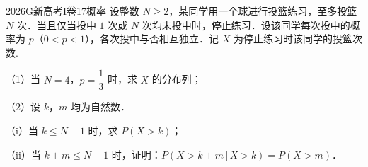 
\begin{problem}{2026}{G}{新高考I卷}{17}{概率}
设整数 $ N\geqslant 2 $，某同学用一个球进行投篮练习，至多投篮 $ N $ 次．当且仅当投中 $ 1 $ 次或 $ N $ 次均未投中时，停止练习．设该同学每次投中的概率为 $ p $（$ 0<p<1 $），各次投中与否相互独立．记 $ X $ 为停止练习时该同学的投篮次数.

（1）当 $ N=4 $，$ p=\dfrac{1}{3} $ 时，求 $ X $ 的分布列；

（2）设 $ k $，$ m $ 均为自然数．

（i）当 $ k\leqslant N-1 $ 时，求 $ P(X>k) $；

（ii）当 $ k+m\leqslant N-1 $ 时，证明：$ P(X>k+m\,|\,X>k)=P(X>m) $．
\end{problem}

\begin{answer}

\end{answer}

\begin{solutions}

\end{solutions}